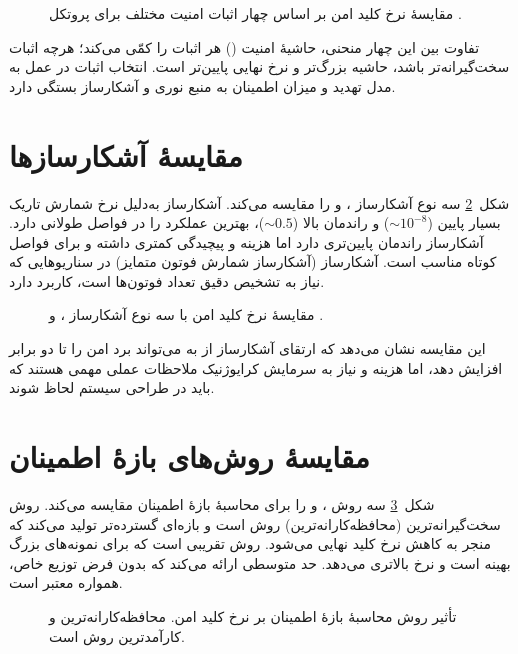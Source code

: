 \begin{figure}[htbp]
\centering
{}
\caption{مقایسهٔ نرخ کلید امن بر اساس چهار اثبات امنیت مختلف برای پروتکل .}
\label{fig:06_proofs}
\end{figure}

تفاوت بین این چهار منحنی، حاشیهٔ امنیت () هر اثبات را کمّی می‌کند؛ هرچه اثبات سخت‌گیرانه‌تر باشد، حاشیه بزرگ‌تر و نرخ نهایی پایین‌تر است. انتخاب اثبات در عمل به مدل تهدید و میزان اطمینان به منبع نوری و آشکارساز بستگی دارد.

\section{مقایسهٔ آشکارسازها}
شکل~\ref{fig:07_detectors} سه نوع آشکارساز ،  و  را مقایسه می‌کند. آشکارساز  به‌دلیل نرخ شمارش تاریک بسیار پایین ($\sim 10^{-8}$) و راندمان بالا ($\sim 0.5$)، بهترین عملکرد را در فواصل طولانی دارد. آشکارساز  راندمان پایین‌تری دارد اما هزینه و پیچیدگی کمتری داشته و برای فواصل کوتاه مناسب است. آشکارساز  (آشکارساز شمارش فوتون متمایز) در سناریوهایی که نیاز به تشخیص دقیق تعداد فوتون‌ها است، کاربرد دارد.

\begin{figure}[htbp]
\centering
{}
\caption{مقایسهٔ نرخ کلید امن با سه نوع آشکارساز ،  و .}
\label{fig:07_detectors}
\end{figure}

این مقایسه نشان می‌دهد که ارتقای آشکارساز از  به  می‌تواند برد امن را تا دو برابر افزایش دهد، اما هزینه و نیاز به سرمایش کرایوژنیک ملاحظات عملی مهمی هستند که باید در طراحی سیستم لحاظ شوند.

\section{مقایسهٔ روش‌های بازهٔ اطمینان}
شکل~\ref{fig:08_confidence} سه روش ،  و  را برای محاسبهٔ بازهٔ اطمینان  مقایسه می‌کند. روش  سخت‌گیرانه‌ترین (محافظه‌کارانه‌ترین) روش است و بازه‌ای گسترده‌تر تولید می‌کند که منجر به کاهش نرخ کلید نهایی می‌شود.  روش تقریبی است که برای نمونه‌های بزرگ بهینه است و نرخ بالاتری می‌دهد.  حد متوسطی ارائه می‌کند که بدون فرض توزیع خاص، همواره معتبر است.

\begin{figure}[htbp]
\centering
{}
\caption{تأثیر روش محاسبهٔ بازهٔ اطمینان بر نرخ کلید امن.  محافظه‌کارانه‌ترین و  کارآمدترین روش است.}
\label{fig:08_confidence}
\end{figure}

